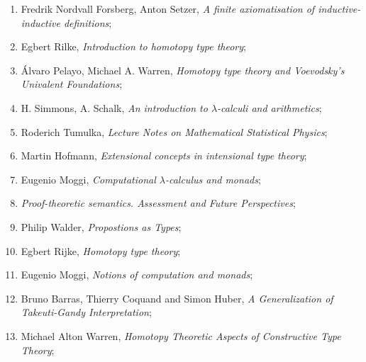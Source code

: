 \documentclass[a4paper,11pt]{article}
\begin{document}
\begin{enumerate}
\item Fredrik Nordvall Forsberg, Anton Setzer, \textit{A finite
    axiomatisation of inductive-inductive definitions};



\item Egbert Rilke, \textit{Introduction to homotopy type theory};



\item \'{A}lvaro Pelayo, Michael A. Warren, \textit{Homotopy type
    theory and Voevodsky’s Univalent Foundations};



\item H. Simmons, A. Schalk, \textit{An introduction to
    $\lambda$-calculi and arithmetics};



\item Roderich Tumulka, \textit{Lecture Notes on Mathematical
    Statistical Physics};



\item Martin Hofmann, \textit{Extensional concepts in intensional type
    theory};



\item Eugenio Moggi, \textit{Computational $\lambda$-calculus and monads};



\item \textit{Proof-theoretic semantics. Assessment and Future
    Perspectives};



\item Philip Walder, \textit{Propostions as Types};



\item Egbert Rijke, \textit{Homotopy type theory};



\item Eugenio Moggi, \textit{Notions of computation and monads};



\item Bruno Barras, Thierry Coquand and Simon Huber, \textit{A
    Generalization of Takeuti-Gandy Interpretation};



\item Michael Alton Warren, \textit{Homotopy Theoretic Aspects of
    Constructive Type Theory};




\end{enumerate}
\end{document}
